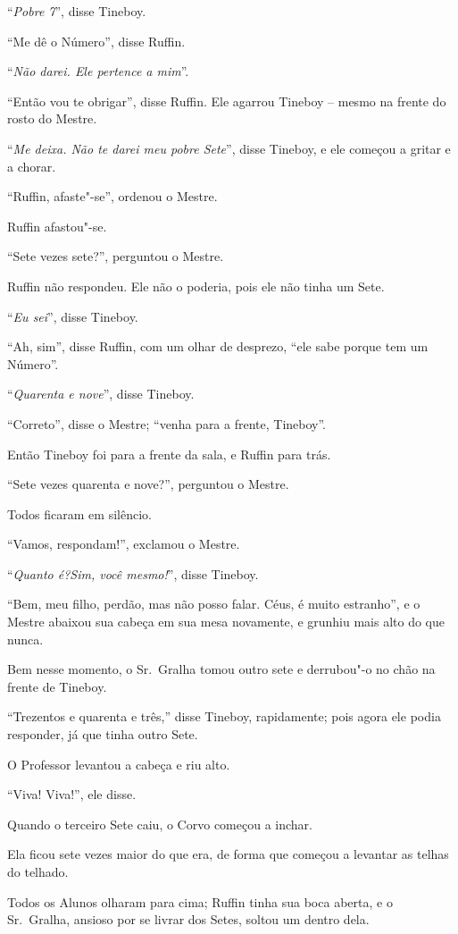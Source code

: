 ``\emph{Pobre 7}'', disse Tineboy.

``Me dê o Número'', disse Ruffin.

``\emph{Não darei. Ele pertence a mim}''.

``Então vou te obrigar'', disse Ruffin. Ele agarrou Tineboy -- mesmo na
frente do rosto do Mestre.

``\emph{Me deixa. Não te darei meu pobre Sete}'', disse Tineboy, e ele
começou a gritar e a chorar.

``Ruffin, afaste"-se'', ordenou o Mestre.

Ruffin afastou"-se.

``Sete vezes sete?'', perguntou o Mestre.

Ruffin não respondeu. Ele não o poderia, pois ele não tinha um Sete.

``\emph{Eu sei}'', disse Tineboy.

``Ah, sim'', disse Ruffin, com um olhar de desprezo, ``ele sabe porque
tem um Número''.

``\emph{Quarenta e nove}'', disse Tineboy.

``Correto'', disse o Mestre; ``venha para a frente, Tineboy''.

Então Tineboy foi para a frente da sala, e Ruffin para trás.

``Sete vezes quarenta e nove?'', perguntou o Mestre.

Todos ficaram em silêncio.

``Vamos, respondam!'', exclamou o Mestre.

``\emph{Quanto é?Sim, você mesmo!}'', disse Tineboy.

``Bem, meu filho, perdão, mas não posso falar. Céus, é muito estranho'',
e o Mestre abaixou sua cabeça em sua mesa novamente, e grunhiu mais alto
do que nunca.

Bem nesse momento, o Sr.~Gralha tomou outro sete e derrubou"-o no chão na
frente de Tineboy.

``Trezentos e quarenta e três,'' disse Tineboy, rapidamente; pois agora
ele podia responder, já que tinha outro Sete.

O Professor levantou a cabeça e riu alto.

``Viva! Viva!'', ele disse.

Quando o terceiro Sete caiu, o Corvo começou a inchar.

Ela ficou sete vezes maior do que era, de forma que começou a levantar
as telhas do telhado.

Todos os Alunos olharam para cima; Ruffin tinha sua boca aberta, e o Sr.~Gralha, ansioso por se livrar dos Setes, soltou um dentro dela.

